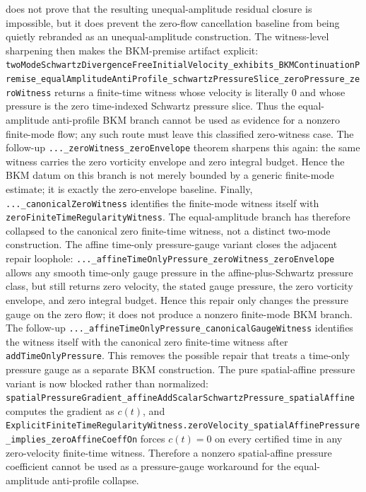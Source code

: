\documentclass[11pt]{article}
\begin{document}
does not prove that the resulting unequal-amplitude residual closure is
impossible, but it does prevent the zero-flow cancellation baseline from being
quietly rebranded as an unequal-amplitude construction.
The witness-level sharpening then makes the BKM-premise artifact explicit:
\texttt{twoModeSchwartzDivergenceFreeInitialVelocity\_exhibits\_BKMContinuationPremise\_equalAmplitudeAntiProfile\_schwartzPressureSlice\_zeroPressure\_zeroWitness}
returns a finite-time witness whose velocity is literally \(0\) and whose
pressure is the zero time-indexed Schwartz pressure slice.  Thus the
equal-amplitude anti-profile BKM branch cannot be used as evidence for a
nonzero finite-mode flow; any such route must leave this classified
zero-witness case.  The follow-up
\texttt{...\_zeroWitness\_zeroEnvelope} theorem sharpens this again: the same
witness carries the zero vorticity envelope and zero integral budget.  Hence
the BKM datum on this branch is not merely bounded by a generic finite-mode
estimate; it is exactly the zero-envelope baseline.  Finally,
\texttt{...\_canonicalZeroWitness} identifies the finite-mode witness itself
with \texttt{zeroFiniteTimeRegularityWitness}.  The equal-amplitude branch has
therefore collapsed to the canonical zero finite-time witness, not a distinct
two-mode construction.
The affine time-only pressure-gauge variant closes the adjacent repair
loophole: \texttt{...\_affineTimeOnlyPressure\_zeroWitness\_zeroEnvelope}
allows any smooth time-only gauge pressure in the affine-plus-Schwartz pressure
class, but still returns zero velocity, the stated gauge pressure, the zero
vorticity envelope, and zero integral budget.  Hence this repair only changes
the pressure gauge on the zero flow; it does not produce a nonzero finite-mode
BKM branch.  The follow-up
\texttt{...\_affineTimeOnlyPressure\_canonicalGaugeWitness} identifies the
witness itself with the canonical zero finite-time witness after
\texttt{addTimeOnlyPressure}.  This removes the possible repair that treats a
time-only pressure gauge as a separate BKM construction.
The pure spatial-affine pressure variant is now blocked rather than normalized:
\texttt{spatialPressureGradient\_affineAddScalarSchwartzPressure\_spatialAffine}
computes the gradient as \(c(t)\), and
\texttt{ExplicitFiniteTimeRegularityWitness.zeroVelocity\_spatialAffinePressure\_implies\_zeroAffineCoeffOn}
forces \(c(t)=0\) on every certified time in any zero-velocity finite-time
witness.  Therefore a nonzero spatial-affine pressure coefficient cannot be used
as a pressure-gauge workaround for the equal-amplitude anti-profile collapse.
\end{document}
